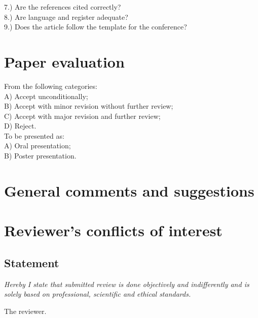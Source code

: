 \documentclass[12pt,a4paper]{article} %
\begin{document}
7.) Are the references cited correctly?
\\

8.) Are language and register adequate?
\\

9.) Does the article follow the template for the conference?

\section{Paper evaluation}


From the following categories: \\

A) Accept unconditionally;                              \\
B) Accept with minor revision without further review;   \\
C) Accept with major revision and further review;       \\
D) Reject.
\\

To be presented as:\\

A) Oral presentation; \\
B) Poster presentation.

\section{General comments and suggestions}

\section{Reviewer's conflicts of interest}

\subsection*{Statement}
\textit{Hereby I state that submitted review is done objectively and indifferently and is solely based on professional, scientific and ethical standards.}

\raggedleft The reviewer.
\end{document}
